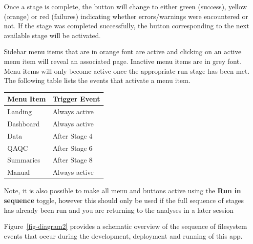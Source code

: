 \documentclass[
  8pt,
  a4paper]{article}
\begin{document}
Once a stage is complete, the button will change to either green
(success), yellow (orange) or red (failures) indicating whether
errors/warnings were encountered or not. If the stage was completed
successfully, the button corresponding to the next available stage will
be activated.

Sidebar menu items that are in orange font are active and clicking on an
active menu item will reveal an associated page. Inactive menu items are
in grey font. Menu items will only become active once the appropriate
run stage has been met. The following table lists the events that
activate a menu item.

\begin{longtable}[]{@{}ll@{}}
\toprule\noalign{}
Menu Item & Trigger Event \\
\midrule\noalign{}
\endhead
\bottomrule\noalign{}
\endlastfoot
Landing & Always active \\
Dashboard & Always active \\
Data & After Stage 4 \\
QAQC & After Stage 6 \\
Summaries & After Stage 8 \\
Manual & Always active \\
\end{longtable}

Note, it is also possible to make all menu and buttons active using the
\textbf{Run in sequence} toggle, however this should only be used if the
full sequence of stages has already been run and you are returning to
the analyses in a later session

Figure~\ref{fig-diagram2} provides a schematic overview of the sequence
of filesystem events that occur during the development, deployment and
running of this app.
\end{document}
